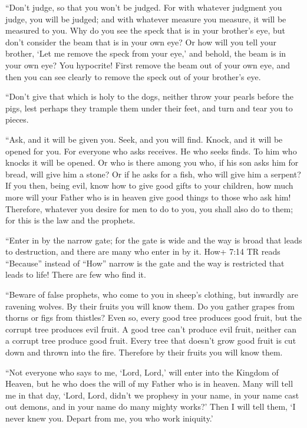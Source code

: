  ``Don't judge, so that you won't be judged. 
For with whatever judgment you judge, you will be judged; and with
whatever measure you measure, it will be measured to you. 
Why do you see the speck that is in your brother's eye, but don't
consider the beam that is in your own eye?  Or how will you
tell your brother, `Let me remove the speck from your eye,' and behold,
the beam is in your own eye?  You hypocrite! First remove
the beam out of your own eye, and then you can see clearly to remove the
speck out of your brother's eye.

 ``Don't give that which is holy to the dogs, neither throw
your pearls before the pigs, lest perhaps they trample them under their
feet, and turn and tear you to pieces.

 ``Ask, and it will be given you. Seek, and you will find.
Knock, and it will be opened for you.  For everyone who asks
receives. He who seeks finds. To him who knocks it will be opened.
 Or who is there among you who, if his son asks him for
bread, will give him a stone?  Or if he asks for a fish,
who will give him a serpent?  If you then, being evil, know
how to give good gifts to your children, how much more will your Father
who is in heaven give good things to those who ask him! 
Therefore, whatever you desire for men to do to you, you shall also do
to them; for this is the law and the prophets.

 ``Enter in by the narrow gate; for the gate is wide and
the way is broad that leads to destruction, and there are many who enter
in by it.  How+ 7:14 TR reads ``Because'' instead of
``How'' narrow is the gate and the way is restricted that leads to life!
There are few who find it.

 ``Beware of false prophets, who come to you in sheep's
clothing, but inwardly are ravening wolves.  By their
fruits you will know them. Do you gather grapes from thorns or figs from
thistles?  Even so, every good tree produces good fruit,
but the corrupt tree produces evil fruit.  A good tree
can't produce evil fruit, neither can a corrupt tree produce good fruit.
 Every tree that doesn't grow good fruit is cut down and
thrown into the fire.  Therefore by their fruits you will
know them.

 ``Not everyone who says to me, `Lord, Lord,' will enter
into the Kingdom of Heaven, but he who does the will of my Father who is
in heaven.  Many will tell me in that day, `Lord, Lord,
didn't we prophesy in your name, in your name cast out demons, and in
your name do many mighty works?'  Then I will tell them, `I
never knew you. Depart from me, you who work iniquity.'

